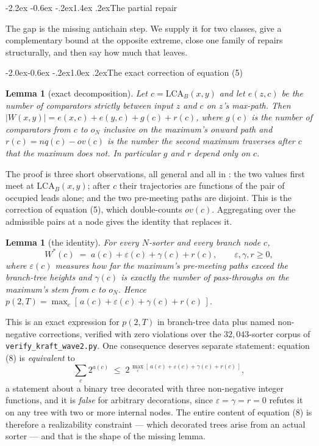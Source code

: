 \documentclass[11pt,a4paper]{article}
\makeatletter
\renewcommand\section{\@startsection{section}{1}{\z@}%
  {-2.2ex \@plus -0.6ex \@minus -.2ex}{1.4ex \@plus.2ex}{\normalfont\large\bfseries}}
\renewcommand\subsection{\@startsection{subsection}{2}{\z@}%
  {-2.0ex\@plus -0.6ex \@minus -.2ex}{1.0ex \@plus .2ex}{\normalfont\normalsize\bfseries}}
\newtheorem{lemma}[statement]{Lemma}
\newcommand{\LCA}{\mathrm{LCA}}
\makeatother
\begin{document}
\section{The partial repair}
\label{sec:repair}

The gap is the missing antichain step. We supply it for two classes, give a
complementary bound at the opposite extreme, close one family of repairs
structurally, and then say how much that leaves.

\subsection{The exact correction of equation (5)}

\begin{lemma}[exact decomposition]
\label{lem:decomp}
Let $c = \LCA_B(x,y)$ and let $e(z,c)$ be the number of comparators strictly
between input $z$ and $c$ on $z$'s max-path. Then
$|W(x,y)| = e(x,c) + e(y,c) + g(c) + r(c)$, where $g(c)$ is the number of
comparators from $c$ to $o_N$ inclusive on the maximum's onward path and
$r(c) = nq(c) - ov(c)$ is the number the second maximum traverses after $c$
that the maximum does not. In particular $g$ and $r$ depend only on $c$.
\end{lemma}

The proof is three short observations, all general and all in \cite{Art}: the
two values first meet at $\LCA_B(x,y)$; after $c$ their trajectories are
functions of the pair of occupied leads alone; and the two pre-meeting paths are
disjoint. This is the correction of equation (5), which double-counts $ov(c)$.
Aggregating over the admissible pairs at a node gives the identity that replaces
it.

\begin{lemma}[the identity]
\label{lem:identity}
For every $N$-sorter and every branch node $c$,
\[
  W^*(c) \;=\; a(c) + \varepsilon(c) + \gamma(c) + r(c),
  \qquad \varepsilon, \gamma, r \ge 0 ,
\]
where $\varepsilon(c)$ measures how far the maximum's pre-meeting paths exceed
the branch-tree heights and $\gamma(c)$ is exactly the number of pass-throughs
on the maximum's stem from $c$ to $o_N$. Hence
$p(2,T) = \max_c [\,a(c) + \varepsilon(c) + \gamma(c) + r(c)\,]$.
\end{lemma}

This is an exact expression for $p(2,T)$ in branch-tree data plus named
non-negative corrections, verified with zero violations over the
$32{,}043$-sorter corpus of \texttt{verify\_kraft\_wave2.py}. One consequence
deserves separate statement: equation (8) is \emph{equivalent} to
\[
  \sum_c 2^{a(c)} \;\le\; 2^{\,\max_c [\,a(c)+\varepsilon(c)+\gamma(c)+r(c)\,]},
\]
a statement about a binary tree decorated with three non-negative integer
functions, and it is \emph{false} for arbitrary decorations, since
$\varepsilon = \gamma = r = 0$ refutes it on any tree with two or more internal
nodes. The entire content of equation (8) is therefore a realizability
constraint --- which decorated trees arise from an actual sorter --- and that is
the shape of the missing lemma.
\end{document}
